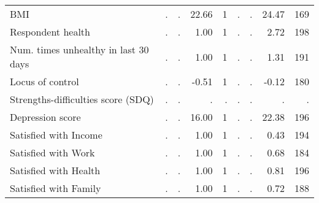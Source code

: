 \begin{tabular}{l r r r r r r r r}
BMI &         . & . &     22.66 &         1 &         . & . &     24.47 &       169 \\
Respondent health &         . & . &      1.00 &         1 &         . & . &      2.72 &       198 \\
Num. times unhealthy in last 30 days &         . & . &      1.00 &         1 &         . & . &      1.31 &       191 \\
Locus of control &         . & . &     -0.51 &         1 &         . & . &     -0.12 &       180 \\
Strengths-difficulties score (SDQ) &         . & . &         . & . &         . & . &         . & . \\
Depression score &         . & . &     16.00 &         1 &         . & . &     22.38 &       196 \\
Satisfied with Income &         . & . &      1.00 &         1 &         . & . &      0.43 &       194 \\
Satisfied with Work &         . & . &      1.00 &         1 &         . & . &      0.68 &       184 \\
Satisfied with Health &         . & . &      1.00 &         1 &         . & . &      0.81 &       196 \\
Satisfied with Family &         . & . &      1.00 &         1 &         . & . &      0.72 &       188 \\
\bottomrule
\end{tabular}
